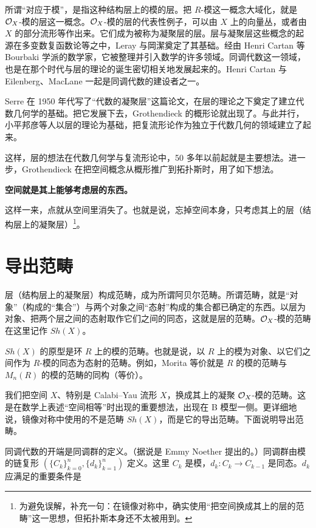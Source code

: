 所谓“对应于模”，是指这种结构层上的模的层。把 $R$-模这一概念大域化，就是 $\mathcal{O}_X$-模的层这一概念。$\mathcal{O}_X$-模的层的代表性例子，可以由 $X$ 上的向量丛，或者由 $X$ 的部分流形等作出来。它们成为被称为凝聚层的层。层与凝聚层这些概念的起源在多变数复函数论等之中，Leray 与岡潔奠定了其基础。经由 Henri Cartan 等 Bourbaki 学派的数学家，它被整理并引入数学的许多领域。同调代数这一领域，也是在那个时代与层的理论的诞生密切相关地发展起来的。Henri Cartan 与 Eilenberg、MacLane 一起是同调代数的建设者之一。

Serre 在 1950 年代写了“代数的凝聚层”这篇论文，在层的理论之下奠定了建立代数几何学的基础。把它发展下去，Grothendieck 的概形论就出现了。与此并行，小平邦彦等人以层的理论为基础，把复流形论作为独立于代数几何的领域建立了起来。

这样，层的想法在代数几何学与复流形论中，50 多年以前起就是主要想法。进一步，Grothendieck 在把空间概念从概形推广到拓扑斯时，用了如下想法。

\par\medskip
\noindent\textbf{空间就是其上能够考虑层的东西。}
\par\medskip

这样一来，点就从空间里消失了。也就是说，忘掉空间本身，只考虑其上的层（结构层上的凝聚层）\footnote{为避免误解，补充一句：在镜像对称中，确实使用“把空间换成其上的层的范畴”这一思想，但拓扑斯本身还不太被用到。}。

\section{导出范畴}

层（结构层上的凝聚层）构成范畴，成为所谓阿贝尔范畴。所谓范畴，就是“对象”（构成的“集合”）与两个对象之间“态射”构成的集合都已确定的东西。以层为对象、把两个层之间的态射取作它们之间的同态，这就是层的范畴。$\mathcal{O}_X$-模的范畴在这里记作 $Sh(X)$。

$Sh(X)$ 的原型是环 $R$ 上的模的范畴。也就是说，以 $R$ 上的模为对象、以它们之间作为 $R$-模的同态为态射的范畴。例如，Morita 等价就是 $R$ 的模的范畴与 $M_n(R)$ 的模的范畴的同构（等价）。

我们把空间 $X$、特别是 Calabi--Yau 流形 $X$，换成其上的凝聚 $\mathcal{O}_X$-模的范畴。这是在数学上表述“空间相等”时出现的重要想法，出现在 B 模型一侧。更详细地说，镜像对称中使用的不是范畴 $Sh(X)$，而是它的导出范畴。下面说明导出范畴。

同调代数的开端是同调群的定义。（据说是 Emmy Noether 提出的。）同调群由模的链复形 $(\{C_k\}_{k=0}^n, \{d_k\}_{k=1}^n)$ 定义。这里 $C_k$ 是模，$d_k : C_k \to C_{k-1}$ 是同态。$d_k$ 应满足的重要条件是

